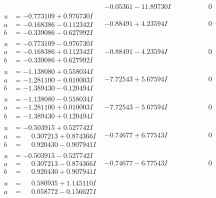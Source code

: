 \documentclass[1p]{elsarticle_modified}
\theoremstyle{definition}
\begin{document}
$$\begin{array}{c|c|c}
 & -0.05361 - 11.89730 I & \phantom{-0.000000 } 0 \\ \hline\begin{aligned}
u &= -0.773109 + 0.976730 I \\
a &= -0.168386 - 0.112342 I \\
b &= -0.339086 - 0.627992 I\end{aligned}
 & -0.88491 + 4.23594 I & \phantom{-0.000000 } 0 \\ \hline\begin{aligned}
u &= -0.773109 - 0.976730 I \\
a &= -0.168386 + 0.112342 I \\
b &= -0.339086 + 0.627992 I\end{aligned}
 & -0.88491 - 4.23594 I & \phantom{-0.000000 } 0 \\ \hline\begin{aligned}
u &= -1.138080 + 0.558034 I \\
a &= -1.281100 - 0.010003 I \\
b &= -1.389430 - 0.120494 I\end{aligned}
 & -7.72543 + 5.67594 I & \phantom{-0.000000 } 0 \\ \hline\begin{aligned}
u &= -1.138080 - 0.558034 I \\
a &= -1.281100 + 0.010003 I \\
b &= -1.389430 + 0.120494 I\end{aligned}
 & -7.72543 - 5.67594 I & \phantom{-0.000000 } 0 \\ \hline\begin{aligned}
u &= -0.503915 + 0.527742 I \\
a &= \phantom{-}0.307213 + 0.874366 I \\
b &= \phantom{-}0.920430 - 0.907941 I\end{aligned}
 & -0.74677 + 6.77543 I & \phantom{-0.000000 } 0 \\ \hline\begin{aligned}
u &= -0.503915 - 0.527742 I \\
a &= \phantom{-}0.307213 - 0.874366 I \\
b &= \phantom{-}0.920430 + 0.907941 I\end{aligned}
 & -0.74677 - 6.77543 I & \phantom{-0.000000 } 0 \\ \hline\begin{aligned}
u &= \phantom{-}0.580935 + 1.145110 I \\
a &= \phantom{-}0.058772 - 0.156627 I \\

\end{aligned}
\end{array}$$
\end{document}
